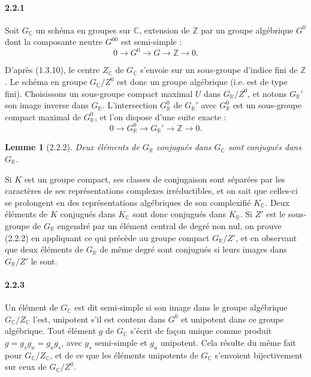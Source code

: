 \documentclass[12pt,a4paper]{article}
\theoremstyle{plain}
\newtheorem{lemma}[theorem]{Lemme}
\theoremstyle{definition}
\theoremstyle{remark}
\newcommand{\CC}{{\mathbb{C}}}
\newcommand{\RR}{{\mathbb{R}}}
\newcommand{\ZZ}{{\mathbb{Z}}}
\begin{document}
\paragraph{2.2.1}
Soit $G_\CC$ un sch\'ema en groupes sur $\CC$, extension de $\ZZ$ par un groupe alg\'ebrique $G^0$ dont la composante neutre $G^{00}$ est semi-simple :
\begin{equation}\label{eq:2.2.1.1}
0 \to G^0 \to G \to \ZZ \to 0.
\end{equation}

D'apr\`es (1.3.10), le centre $Z_\CC$ de $G_\CC$ s'envoie sur un sous-groupe d'indice fini de $\ZZ$. Le sch\'ema en groupe $G_\CC/Z^0$ est donc un groupe alg\'ebrique (i.e. est de type fini). Choisissons un sous-groupe compact maximal $U$ dans $G_\RR/Z^0$, et notons $G_\RR'$ son image inverse dans $G_\RR$. L'intersection $G_\RR^0$ de $G_\RR'$ avec $G_\RR^0$ est un sous-groupe compact maximal de $G_\RR^0$, et l'on dispose d'une suite exacte :
\begin{equation}\label{eq:2.2.1.2}
0 \to G_\RR^0 \to G_\RR' \to \ZZ \to 0.
\end{equation}


\begin{lemma}[2.2.2]
Deux \'el\'ements de $G_\RR$ conjugu\'es dans $G_\CC$ sont conjugu\'es dans $G_\RR$.
\end{lemma}

Si $K$ est un groupe compact, ses classes de conjugaison sont s\'epar\'ees par les caract\`eres de ses repr\'esentations complexes irr\'eductibles, et on sait que celles-ci se prolongent en des repr\'esentations alg\'ebriques de son complexifi\'e $K_\CC$. Deux \'el\'ements de $K$ conjugu\'es dans $K_\CC$ sont donc conjugu\'es dans $K_\RR$. Si $Z'$ est le sous-groupe de $G_\RR$ engendr\'e par un \'el\'ement central de degr\'e non nul, on prouve (2.2.2) en appliquant ce qui pr\'ec\`ede au groupe compact $G_\RR/Z'$, et en observant que deux \'el\'ements de $G_\RR$ de m\^eme degr\'e sont conjugu\'es si leurs images dans $G_\RR/Z'$ le sont.

\paragraph{2.2.3}
Un \'el\'ement de $G_\CC$ est dit semi-simple si son image dans le groupe alg\'ebrique $G_\CC/Z_\CC$ l'est, unipotent s'il est contenu dans $G^0$ et unipotent dans ce groupe alg\'ebrique. Tout \'el\'ement $g$ de $G_\CC$ s'\'ecrit de fa\c{c}on unique comme produit $g = g_s g_u = g_u g_s$, avec $g_s$ semi-simple et $g_u$ unipotent. Cela r\'esulte du m\^eme fait pour $G_\CC/Z_\CC$, et de ce que les \'el\'ements unipotents de $G_\CC$ s'envoient bijectivement sur ceux de $G_\CC/Z^0$.
\end{document}
